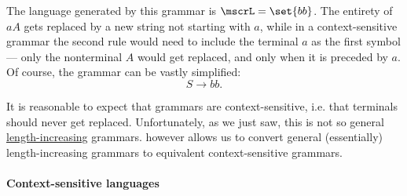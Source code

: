 \begin{example}
\begin{thmenum}
    The language generated by this grammar is \( \mscrL = \set{ bb } \). The entirety of \( aA \) gets replaced by a new string not starting with \( a \), while in a context-sensitive grammar the second rule would need to include the terminal \( a \) as the first symbol --- only the nonterminal \( A \) would get replaced, and only when it is preceded by \( a \). Of course, the grammar can be vastly simplified:
    \begin{equation*}
      S \to bb.
    \end{equation*}

    It is reasonable to expect that grammars are context-sensitive, i.e. that terminals should never get replaced. Unfortunately, as we just saw, this is not so general \hyperref[def:length_increasing_grammar]{length-increasing} grammars.  however allows us to convert general (essentially) length-increasing grammars to equivalent context-sensitive grammars.
  \end{thmenum}
\end{example}

\paragraph{Context-sensitive languages}

